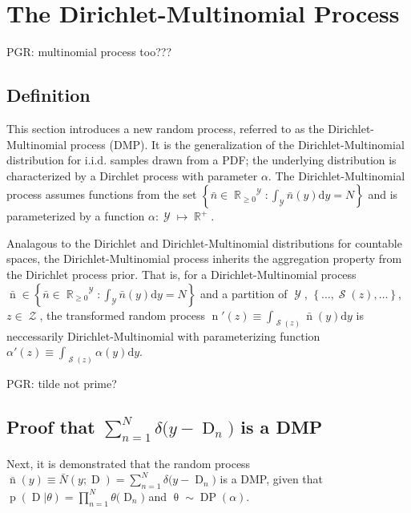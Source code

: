 \documentclass[12pt]{report}
\DeclareMathOperator{\Drm}{\mathrm{D}}
\DeclareMathOperator{\nrm}{\mathrm{n}}
\DeclareMathOperator{\prm}{\mathrm{p}}
\DeclareMathOperator{\Ycal}{\mathcal{Y}}
\DeclareMathOperator{\Zcal}{\mathcal{Z}}
\DeclareMathOperator{\Scal}{\mathcal{S}}
\DeclareMathOperator{\Rbb}{\mathbb{R}}
\DeclareMathOperator{\DP}{\mathrm{DP}}
\begin{document}
\section{The Dirichlet-Multinomial Process} \label{app:DMP}

PGR: multinomial process too???

\subsection{Definition}

This section introduces a new random process, referred to as the Dirichlet-Multinomial process (DMP). It is the generalization of the Dirichlet-Multinomial distribution for i.i.d. samples drawn from a PDF; the underlying distribution is characterized by a Dirchlet process with parameter $\alpha$. The Dirichlet-Multinomial process assumes functions from the set $\left\{ \bar{n} \in {\Rbb_{\geq 0}}^{\Ycal} : \int_{\Ycal} \bar{n}(y) \mathrm{d} y = N \right\}$ and is parameterized by a function $\alpha : \Ycal \mapsto \Rbb^+$.

Analagous to the Dirichlet and Dirichlet-Multinomial distributions for countable spaces, the Dirichlet-Multinomial process inherits the aggregation property from the Dirichlet process prior. That is, for a Dirichlet-Multinomial process $\bar{\nrm} \in \left\{ \bar{n} \in {\Rbb_{\geq 0}}^{\Ycal} : \int_{\Ycal} \bar{n}(y) \mathrm{d} y = N \right\}$ and a partition of $\Ycal$, $\left\{ \ldots,\Scal(z),\ldots \right\}$, $z \in \Zcal$, the transformed random process $\nrm'(z) \equiv \int_{\Scal(z)} \bar{\nrm}(y) \mathrm{d} y$ is neccessarily Dirichlet-Multinomial with parameterizing function $\alpha'(z) \equiv \int_{\Scal(z)} \alpha(y) \mathrm{d} y$.

PGR: tilde not prime?

\subsection{Proof that $\sum_{n=1}^N \delta\big( y-\Drm_n \big)$ is a DMP}

Next, it is demonstrated that the random process $\bar{\nrm}(y) \equiv \bar{N}(y;\Drm) = \sum_{n=1}^N \delta\big( y-\Drm_n \big)$ is a DMP, given that $\prm(\Drm|\theta) = \prod_{n=1}^N \theta\big( \Drm_n \big)$ and $\uptheta \sim \DP(\alpha)$. 
\end{document}
